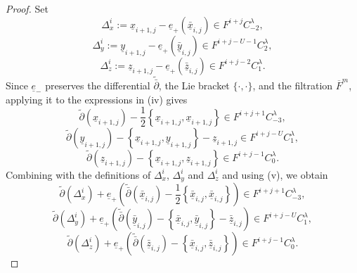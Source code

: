 \documentclass[a4paper]{article}
\numberwithin{equation}{section}
\begin{document}
\begin{proof}
Set
\begin{equation}
\Delta_x^i:=\underline{x}_{i+1,j}-\underline{e}_+(\bar{\underline{x}}_{i,j})\in F^{i+j}C_{-2}^\lambda,
\end{equation}
\begin{equation}
\Delta_y^i:=\underline{y}_{i+1,j}-\underline{e}_+(\bar{\underline{y}}_{i,j})\in F^{i+j-U-1}C_2^\lambda,
\end{equation}
\begin{equation}
\Delta_z^i:=\underline{z}_{i+1,j}-\underline{e}_+(\bar{\underline{z}}_{i,j})\in F^{i+j-2}C_1^\lambda.
\end{equation}
Since $\underline{e}_-$ preserves the differential $\tilde{\bar{\partial}}$, the Lie bracket $\{\cdot,\cdot\}$, and the filtration $\overline{F}^m$, applying it to the expressions in (iv) gives
\begin{equation}
\tilde{\partial}(\underline{x}_{i+1,j})-\frac{1}{2}\left\{\underline{x}_{i+1,j},\underline{x}_{i+1,j}\right\}\in F^{i+j+1}C_{-3}^\lambda,
\end{equation}
\begin{equation}
\tilde{\partial}(\underline{y}_{i+1,j})-\left\{\underline{x}_{i+1,j},\underline{y}_{i+1,j}\right\}-\underline{z}_{i+1,j}\in F^{i+j-U}C_1^\lambda,
\end{equation}
\begin{equation}
\tilde{\partial}(\underline{z}_{i+1,j})-\left\{\underline{x}_{i+1,j},\underline{z}_{i+1,j}\right\}\in F^{i+j-1}C_0^\lambda.
\end{equation}
Combining with the definitions of $\Delta_x^i$, $\Delta_y^i$ and $\Delta_z^i$ and using (v), we obtain
\begin{equation}
\tilde{\partial}(\Delta_x^i)+\underline{e}_+\left(\tilde{\bar{\partial}}(\bar{\underline{x}}_{i,j})-\frac{1}{2}\left\{\bar{\underline{x}}_{i,j},\bar{\underline{x}}_{i,j}\right\}\right)\in F^{i+j+1}C_{-3}^\lambda,
\end{equation}
\begin{equation}
\tilde{\partial}(\Delta_y^i)+\underline{e}_+\left(\tilde{\bar{\partial}}(\bar{\underline{y}}_{i,j})-\left\{\bar{\underline{x}}_{i,j},\bar{\underline{y}}_{i,j}\right\}-\bar{\underline{z}}_{i,j}\right)\in F^{i+j-U}C_1^\lambda,
\end{equation}
\begin{equation}
\tilde{\partial}(\Delta_z^i)+\underline{e}_+\left(\tilde{\bar{\partial}}(\bar{\underline{z}}_{i,j})-\left\{\bar{\underline{x}}_{i,j},\bar{\underline{z}}_{i,j}\right\}\right)\in F^{i+j-1}C_0^\lambda.

\end{equation}
\end{proof}
\end{document}
